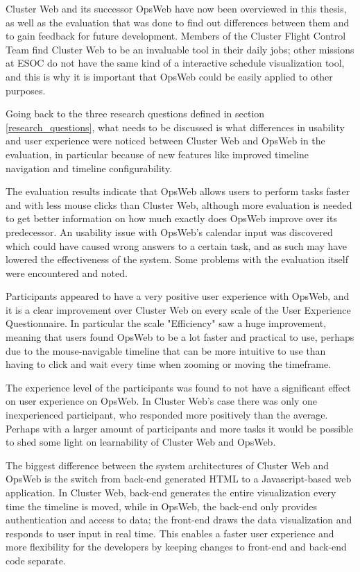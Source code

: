 
Cluster Web and its successor OpsWeb have now been overviewed in this thesis, as well as the evaluation that was done to find out differences between them and to gain feedback for future development. Members of the Cluster Flight Control Team find Cluster Web to be an invaluable tool in their daily jobs; other missions at ESOC do not have the same kind of a interactive schedule visualization tool, and this is why it is important that OpsWeb could be easily applied to other purposes.

Going back to the three research questions defined in section \ref{research_questions}, what needs to be discussed is what differences in usability and user experience were noticed between Cluster Web and OpsWeb in the evaluation, in particular because of new features like improved timeline navigation and timeline configurability.

The evaluation results indicate that OpsWeb allows users to perform tasks faster and with less mouse clicks than Cluster Web, although more evaluation is needed to get better information on how much exactly does OpsWeb improve over its predecessor. An usability issue with OpsWeb's calendar input was discovered which could have caused wrong answers to a certain task, and as such may have lowered the effectiveness of the system. Some problems with the evaluation itself were encountered and noted.

Participants appeared to have a very positive user experience with OpsWeb, and it is a clear improvement over Cluster Web on every scale of the User Experience Questionnaire. In particular the scale "Efficiency" saw a huge improvement, meaning that users found OpsWeb to be a lot faster and practical to use, perhaps due to the mouse-navigable timeline that can be more intuitive to use than having to click and wait every time when zooming or moving the timeframe.

The experience level of the participants was found to not have a significant effect on user experience on OpsWeb. In Cluster Web's case there was only one inexperienced participant, who responded more positively than the average. Perhaps with a larger amount of participants and more tasks it would be possible to shed some light on learnability of Cluster Web and OpsWeb.

The biggest difference between the system architectures of Cluster Web and OpsWeb is the switch from back-end generated HTML to a Javascript-based web application. In Cluster Web, back-end generates the entire visualization every time the timeline is moved, while in OpsWeb, the back-end only provides authentication and access to data; the front-end draws the data visualization and responds to user input in real time. This enables a faster user experience and more flexibility for the developers by keeping changes to front-end and back-end code separate.


